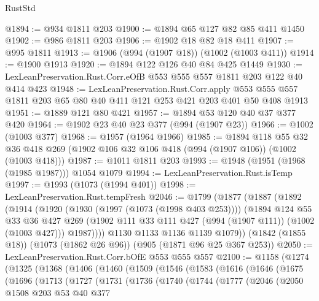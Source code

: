 \begin{lexlean}{RustStd}
\begin{coremodule}
@1894 := @934 @1811 @203
@1900 := @1894 @65 @127 @82 @85 @411 @1450
@1902 := @986 @1811 @203
@1906 := @1902 @18 @82 @18 @411
@1907 := @995 @1811
@1913 := @1906 (@994 (@1907 @18)) (@1002 (@1003 @411))
@1914 := @1900 @1913
@1920 := @1894 @122 @126 @40 @84 @425 @1449
@1930 := LexLeanPreservation.Rust.Corr.eOfB @553 @555 @557 @1811 @203 @122 @40 @414 @423
@1948 := LexLeanPreservation.Rust.Corr.apply
    @553
    @555
    @557
    @1811
    @203
    @65
    @80
    @40
    @411
    @121
    @253
    @421
    @203
    @401
    @50
    @408
    @1913
@1951 := @1889 @121 @80 @421
@1957 := @1894 @53 @120 @40 @37 @377 @420
@1964 := @1902 @23 @40 @23 @377 (@994 (@1907 @23))
@1966 := @1002 (@1003 @377)
@1968 := @1957 (@1964 @1966)
@1985 := @1894
    @118
    @55
    @32
    @36
    @418
    @269
    (@1902 @106 @32 @106 @418 (@994 (@1907 @106)) (@1002 (@1003 @418)))
@1987 := @1011 @1811 @203
@1993 := @1948 (@1951 (@1968 (@1985 @1987))) @1054 @1079
@1994 := LexLeanPreservation.Rust.isTemp
@1997 := @1993 (@1073 (@1994 @401))
@1998 := LexLeanPreservation.Rust.tempFresh
@2046 := @1799
    (@1877
      (@1887
        (@1892
          (@1914
            (@1920
              (@1930 (@1997 (@1073 (@1998 @403 @253))))
              (@1894
                @124
                @55
                @33
                @36
                @427
                @269
                (@1902 @111 @33 @111 @427 (@994 (@1907 @111)) (@1002 (@1003 @427)))
                @1987))))
        @1130
        @1133
        @1136
        @1139
        @1079))
    (@1842 (@1855 @18))
    (@1073 (@1862 @26 @96))
    (@905 (@1871 @96 @25 @367 @253))
@2050 := LexLeanPreservation.Rust.Corr.bOfE @553 @555 @557
@2100 := @1158
    (@1274
      (@1325
        (@1368
          (@1406
            (@1460
              (@1509
                (@1546
                  (@1583
                    (@1616
                      (@1646
                        (@1675
                          (@1696
                            (@1713
                              (@1727
                                (@1731
                                  (@1736
                                    (@1740
                                      (@1744
                                        (@1777
                                          (@2046
                                            (@2050
                                              @1508
                                              @203
                                              @53
                                              @40
                                              @377

\end{coremodule}
\end{lexlean}
